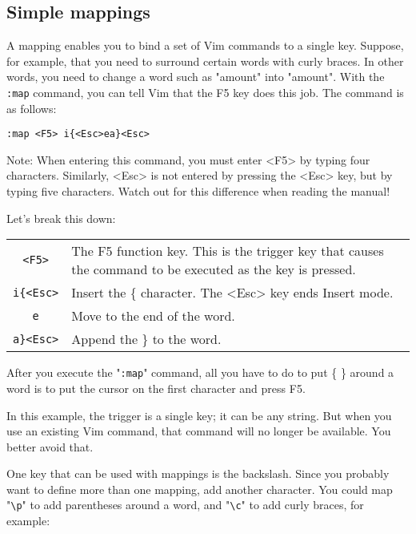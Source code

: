 \subsection{Simple mappings}
\label{Simple mappings}
A mapping enables you to bind a set of Vim commands to a single key.
Suppose, for example, that you need to surround certain words with curly braces.
In other words, you need to change a word such as "amount" into "{amount}".
With the \verb!:map! command, you can tell Vim that the F5 key does this job.
The command is as follows:

 \begin{Verbatim}[samepage=true]
 :map <F5> i{<Esc>ea}<Esc>
 \end{Verbatim}
 
Note: When entering this command, you must enter <F5> by typing four characters.
Similarly, <Esc> is not entered by pressing the <Esc> key, but by typing five characters.
Watch out for this difference when reading the manual!

Let's break this down:
\begin{center}
\begin{tabularx}{\textwidth}{c X}
				\texttt{<F5>} & The F5 function key.
				This is the trigger key that causes the command to be executed as the key is pressed.\\

				\texttt{i\{<Esc>} & Insert the \{ character.
				The <Esc> key ends Insert mode.\\

				\texttt{e} & Move to the end of the word.\\

				\texttt{a\}<Esc>} & Append the \} to the word.\\
\end{tabularx}
\end{center}

After you execute the "\verb!:map!" command, all you have to do to put \{ \} around a word is to put the cursor on the first character and press F5.

In this example, the trigger is a single key; it can be any string.
But when you use an existing Vim command, that command will no longer be available.
You better avoid that.

One key that can be used with mappings is the backslash.
Since you probably want to define more than one mapping, add another character.
You could map "\verb!\p!" to add parentheses around a word, and "\verb!\c!" to add curly braces, for example:

